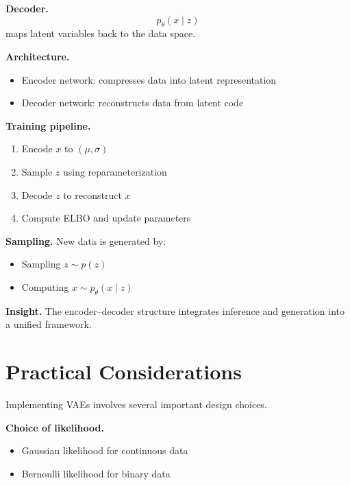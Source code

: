 \medskip

\noindent
\textbf{Decoder.}
\[
p_\theta(x \mid z)
\]
maps latent variables back to the data space.

\medskip

\noindent
\textbf{Architecture.}
\begin{itemize}
    \item Encoder network: compresses data into latent representation
    \item Decoder network: reconstructs data from latent code
\end{itemize}

\medskip

\noindent
\textbf{Training pipeline.}
\begin{enumerate}
    \item Encode $x$ to $(\mu, \sigma)$
    \item Sample $z$ using reparameterization
    \item Decode $z$ to reconstruct $x$
    \item Compute ELBO and update parameters
\end{enumerate}

\medskip

\noindent
\textbf{Sampling.}  
New data is generated by:
\begin{itemize}
    \item Sampling $z \sim p(z)$
    \item Computing $x \sim p_\theta(x \mid z)$
\end{itemize}

\medskip

\noindent
\textbf{Insight.}  
The encoder--decoder structure integrates inference and generation into a unified framework.

\section{Practical Considerations}

Implementing VAEs involves several important design choices.

\medskip

\noindent
\textbf{Choice of likelihood.}
\begin{itemize}
    \item Gaussian likelihood for continuous data
    \item Bernoulli likelihood for binary data
\end{itemize}

